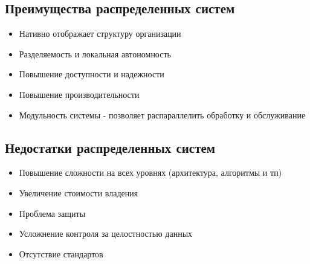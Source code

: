 \documentclass[12pt, a4paper]{article}
\begin{document}
\subsection{Преимущества распределенных систем}
\begin{itemize}
    \item Нативно отображает структуру организации
    \item Разделяемость и локальная автономность
    \item Повышение доступности и надежности
    \item Повышение производительности 
    \item Модульность системы - позволяет распараллелить обработку и обслуживание
\end{itemize}

\subsection{Недостатки распределенных систем}

\begin{itemize}
    \item Повышение сложности на всех уровнях (архитектура, алгоритмы и тп)
    \item Увеличение стоимости владения
    \item Проблема защиты
    \item Усложнение контроля за целостностью данных
    \item Отсутствие стандартов
\end{itemize}
\end{document}
